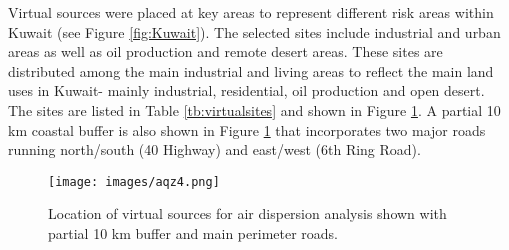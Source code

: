 Virtual sources were placed at key areas to represent different risk areas within Kuwait (see Figure \ref{fig:Kuwait}).  The selected sites include industrial and urban areas as well as oil production and remote desert areas. These sites are distributed among the main industrial and living areas to reflect the main land uses in Kuwait- mainly industrial, residential, oil production and open desert.  The sites are listed in Table \ref{tb:virtualsites} and shown in Figure \ref{fig:virtual-locations}. A partial 10 km coastal buffer is also shown in Figure \ref{fig:virtual-locations} that incorporates two major roads running north/south (40 Highway) and east/west (6th Ring Road).
%
\begin{table}[H]
\centering
\caption{Virtual Site locations.}
\label{tb:virtualsites}
\end{table}
%
%
\begin{figure}[H]
\texttt{[image: images/aqz4.png]} 
\caption[Location of virtual sources]{Location of virtual sources for air dispersion analysis shown with partial 10 km buffer and main perimeter roads.}
\label{fig:virtual-locations}
\end{figure}
%

